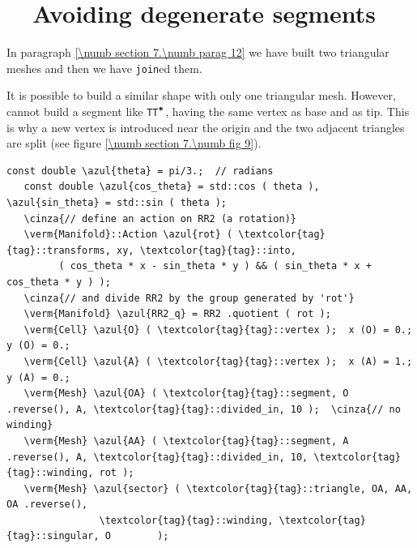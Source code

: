 \section{~~Avoiding degenerate segments}\label{\numb section 7.\numb parag 13}

In paragraph \ref{\numb section 7.\numb parag 12} we have built two triangular meshes
and then we have {\small\tt join}ed them.

It is possible to build a similar shape with only one triangular mesh.
However, {\maniFEM} cannot build a segment like {\small\tt TT$^{\mbox{\small\tt *}}$},
having the same vertex as base and as tip.
This is why a new vertex is introduced near the origin and the two adjacent triangles
are split (see figure \ref{\numb section 7.\numb fig 9}).

\begin{Verbatim}[commandchars=\\\{\},formatcom=\small\tt,frame=single,
   label=parag-\ref{\numb section 7.\numb parag 13}.cpp,rulecolor=\color{coment},
   baselinestretch=0.94,framesep=2mm                                             ]
   const double \azul{theta} = pi/3.;  // radians
   const double \azul{cos_theta} = std::cos ( theta ), \azul{sin_theta} = std::sin ( theta );
   \cinza{// define an action on RR2 (a rotation)}
   \verm{Manifold}::Action \azul{rot} ( \textcolor{tag}{tag}::transforms, xy, \textcolor{tag}{tag}::into,
         ( cos_theta * x - sin_theta * y ) && ( sin_theta * x + cos_theta * y ) );
   \cinza{// and divide RR2 by the group generated by 'rot'}
   \verm{Manifold} \azul{RR2_q} = RR2 .quotient ( rot );
   \verm{Cell} \azul{O} ( \textcolor{tag}{tag}::vertex );  x (O) = 0.;  y (O) = 0.;
   \verm{Cell} \azul{A} ( \textcolor{tag}{tag}::vertex );  x (A) = 1.;  y (A) = 0.;
   \verm{Mesh} \azul{OA} ( \textcolor{tag}{tag}::segment, O .reverse(), A, \textcolor{tag}{tag}::divided_in, 10 );  \cinza{// no winding}
   \verm{Mesh} \azul{AA} ( \textcolor{tag}{tag}::segment, A .reverse(), A, \textcolor{tag}{tag}::divided_in, 10, \textcolor{tag}{tag}::winding, rot );
   \verm{Mesh} \azul{sector} ( \textcolor{tag}{tag}::triangle, OA, AA, OA .reverse(),
                \textcolor{tag}{tag}::winding, \textcolor{tag}{tag}::singular, O        );
\end{Verbatim}

